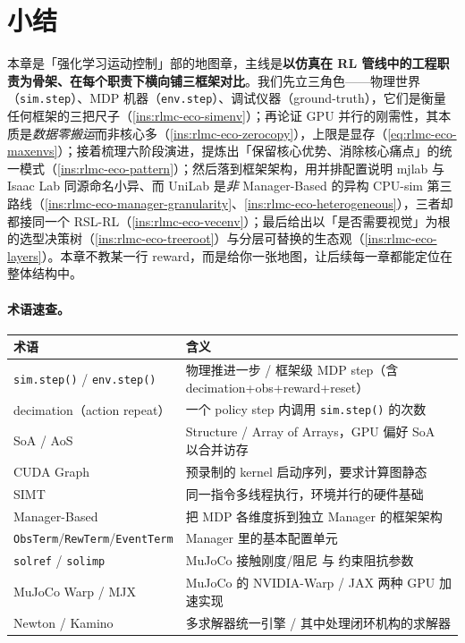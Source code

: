 \section*{小结}
\label{sec:rlmc-eco-summary}

本章是「强化学习运动控制」部的地图章，主线是\textbf{以仿真在 RL 管线中的工程职责为骨架、在每个职责下横向铺三框架对比}。我们先立三角色——物理世界（\verb|sim.step|）、MDP 机器（\verb|env.step|）、调试仪器（ground-truth），它们是衡量任何框架的三把尺子（\cref{ins:rlmc-eco-simenv}）；再论证 GPU 并行的刚需性，其本质是\emph{数据零搬运}而非核心多（\cref{ins:rlmc-eco-zerocopy}），上限是显存（\cref{eq:rlmc-eco-maxenvs}）；接着梳理六阶段演进，提炼出「保留核心优势、消除核心痛点」的统一模式（\cref{ins:rlmc-eco-pattern}）；然后落到框架架构，用并排配置说明 mjlab 与 Isaac Lab 同源命名小异、而 UniLab 是\emph{非} Manager-Based 的异构 CPU-sim 第三路线（\cref{ins:rlmc-eco-manager-granularity}、\cref{ins:rlmc-eco-heterogeneous}），三者却都接同一个 RSL-RL（\cref{ins:rlmc-eco-vecenv}）；最后给出以「是否需要视觉」为根的选型决策树（\cref{ins:rlmc-eco-treeroot}）与分层可替换的生态观（\cref{ins:rlmc-eco-layers}）。本章不教某一行 reward，而是给你一张地图，让后续每一章都能定位在整体结构中。

\paragraph{术语速查。}
\begin{center}
\small
\begin{tabular}{@{}ll@{}}
\toprule
术语 & 含义 \\
\midrule
\verb|sim.step()| / \verb|env.step()| & 物理推进一步 / 框架级 MDP step（含 decimation+obs+reward+reset） \\
decimation（action repeat） & 一个 policy step 内调用 \verb|sim.step()| 的次数 \\
SoA / AoS & Structure / Array of Arrays，GPU 偏好 SoA 以合并访存 \\
CUDA Graph & 预录制的 kernel 启动序列，要求计算图静态 \\
SIMT & 同一指令多线程执行，环境并行的硬件基础 \\
Manager-Based & 把 MDP 各维度拆到独立 Manager 的框架架构 \\
\verb|ObsTerm|/\verb|RewTerm|/\verb|EventTerm| & Manager 里的基本配置单元 \\
\verb|solref| / \verb|solimp| & MuJoCo 接触刚度/阻尼 与 约束阻抗参数 \\
MuJoCo Warp / MJX & MuJoCo 的 NVIDIA-Warp / JAX 两种 GPU 加速实现 \\
Newton / Kamino & 多求解器统一引擎 / 其中处理闭环机构的求解器 \\
\bottomrule
\end{tabular}
\end{center}

